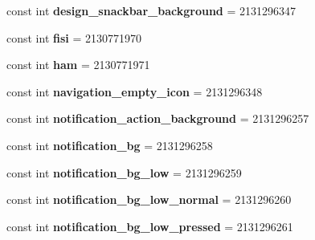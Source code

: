\begin{DoxyCompactItemize}
const int {\bfseries design\+\_\+snackbar\+\_\+background} = 2131296347
\item 
\mbox{\label{classst_delivery_1_1_resource_1_1_drawable_a98c9dbc49a19b16e98abe2ad166474cc}} 
const int {\bfseries fisi} = 2130771970
\item 
\mbox{\label{classst_delivery_1_1_resource_1_1_drawable_ac77468daa0562d2cc5f49b8e4657dc45}} 
const int {\bfseries ham} = 2130771971
\item 
\mbox{\label{classst_delivery_1_1_resource_1_1_drawable_a777dc075a7b9dcb674a1462efb3c035e}} 
const int {\bfseries navigation\+\_\+empty\+\_\+icon} = 2131296348
\item 
\mbox{\label{classst_delivery_1_1_resource_1_1_drawable_ae6471f6c3191be94b589413a697abcce}} 
const int {\bfseries notification\+\_\+action\+\_\+background} = 2131296257
\item 
\mbox{\label{classst_delivery_1_1_resource_1_1_drawable_af2ebe65dd21f4d6032eceb666216058f}} 
const int {\bfseries notification\+\_\+bg} = 2131296258
\item 
\mbox{\label{classst_delivery_1_1_resource_1_1_drawable_a75ce5c37a6e8b663a8f2fd7f7d9b7d8d}} 
const int {\bfseries notification\+\_\+bg\+\_\+low} = 2131296259
\item 
\mbox{\label{classst_delivery_1_1_resource_1_1_drawable_ab45096e352865866368994f68892182f}} 
const int {\bfseries notification\+\_\+bg\+\_\+low\+\_\+normal} = 2131296260
\item 
\mbox{\label{classst_delivery_1_1_resource_1_1_drawable_aa6596a015d61fb152e9fab109de03019}} 
const int {\bfseries notification\+\_\+bg\+\_\+low\+\_\+pressed} = 2131296261
\item 
\mbox{\label{classst_delivery_1_1_resource_1_1_drawable_aed3f23477d7ad36a2e0acfa3c56a4e09}} 

\end{DoxyCompactItemize}
